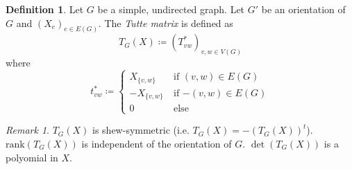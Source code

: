 \documentclass[11pt, a4paper]{article}
\theoremstyle{remark}
\newtheorem{remark}[theorem]{Remark}
\theoremstyle{definition}
\newtheorem{definition}[theorem]{Definition}
\begin{document}
\begin{definition}
	Let $G$ be a simple, undirected graph. Let $G'$ be an orientation
	of $G$ and $(X_e)_{e\in E(G)}$. The \emph{Tutte matrix} is defined as
	\[T_G(X)\coloneqq (T^*_{vw})_{v,w\in V(G)}\]
	where
	\[
		t^*_{vw}\coloneqq \begin{cases}
			X_{\{v,w\}} \quad&\text{if $(v,w)\in E(G)$} \\
			-X_{\{v,w\}} &\text{if $-(v,w)\in E(G)$} \\
			0 &\text{else}
		\end{cases}
	\]
\end{definition}

\begin{remark}
	$T_G(X)$ is shew-symmetric (i.e. $T_G(X)=-(T_G(X))^t$).
	$\mathrm{rank}(T_G(X))$ is independent of the orientation of $G$.
	$\det(T_G(X))$ is a polyomial in $X$.
\end{remark}
\end{document}
